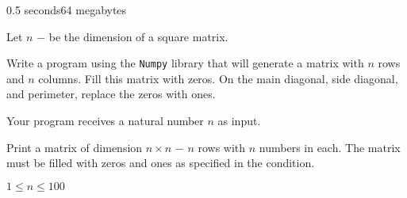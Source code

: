 \begin{problem}{}{}{}{0.5 seconds}{64 megabytes}

Let $n$ $-$ be the dimension of a square matrix.

Write a program using the \texttt{Numpy} library that will generate a matrix with $n$ rows and $n$ columns.
Fill this matrix with zeros. On the main diagonal, side diagonal, and perimeter, replace the zeros with ones.

\InputFile
Your program receives a natural number $n$ as input.

\OutputFile
Print a matrix of dimension $n \times n$ $-$ $n$ rows with $n$ numbers in each. 
The matrix must be filled with zeros and ones as specified in the condition.

\Constraints
$1 \le n \le 100$

\Examples
\begin{example}
%
%
\end{example}

\end{problem}

